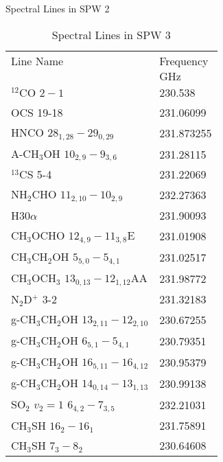 \begin{table*}[htp]
\begin{minipage}[t]{0.5\textwidth}
\end{minipage}
\begin{minipage}[t]{0.5\textwidth}
\centering
\caption{Spectral Lines in SPW 2}

\begin{tabular}{ll}
\label{tab:linesspw2}
Line Name & Frequency \\
 & $\mathrm{GHz}$ \\
\hline
$^{12}$CO $2-1$ & 230.538 \\
OCS 19-18 & 231.06099 \\
HNCO $28_{1,28}-29_{0,29}$ & 231.873255 \\
A-CH$_3$OH $10_{2,9}-9_{3,6}$ & 231.28115 \\
$^{13}$CS 5-4 & 231.22069 \\
NH$_2$CHO $11_{2,10}-10_{2,9}$ & 232.27363 \\
H30$\alpha$ & 231.90093 \\
CH$_3$OCHO $12_{4,9}-11_{3,8}$E & 231.01908 \\
CH$_3$CH$_2$OH $5_{5,0}-5_{4,1}$ & 231.02517 \\
CH$_3$OCH$_3$ $13_{0,13}-12_{1,12}$AA & 231.98772 \\
N$_2$D$^+$ 3-2 & 231.32183 \\
g-CH$_3$CH$_2$OH $13_{2,11}-12_{2,10}$ & 230.67255 \\
g-CH$_3$CH$_2$OH $6_{5,1}-5_{4,1}$ & 230.79351 \\
g-CH$_3$CH$_2$OH $16_{5,11}-16_{4,12}$ & 230.95379 \\
g-CH$_3$CH$_2$OH $14_{0,14}-13_{1,13}$ & 230.99138 \\
SO$_2$ $v_2=1$ $6_{4,2}-7_{3,5}$ & 232.21031 \\
CH$_3$SH $16_2-16_1$ & 231.75891 \\
CH$_3$SH $7_3-8_2$ & 230.64608 \\
\hline
\end{tabular}

\end{minipage}
\begin{minipage}[t]{0.5\textwidth}
\centering
\caption{Spectral Lines in SPW 3}


\end{minipage}
\end{table*}
